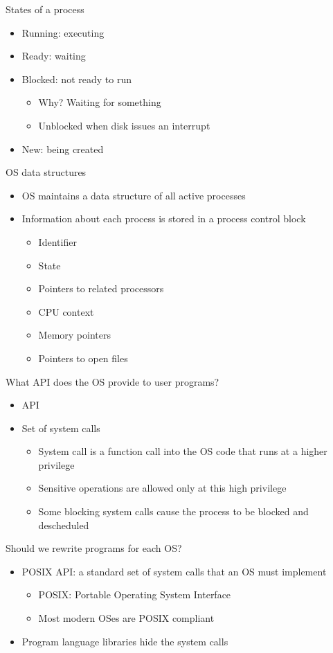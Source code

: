 \documentclass[12pt]{article}
\begin{document}
States of a process
\begin{itemize}
    \item Running: executing
    \item Ready: waiting
    \item Blocked: not ready to run
    \begin{itemize}
        \item Why? Waiting for something
        \item Unblocked when disk issues an interrupt
    \end{itemize}
    \item New: being created
\end{itemize}

OS data structures
\begin{itemize}
    \item OS maintains a data structure of all active processes
    \item Information about each process is stored in a process control block
    \begin{itemize}
        \item Identifier
        \item State
        \item Pointers to related processors
        \item CPU context
        \item Memory pointers
        \item Pointers to open files
    \end{itemize}
\end{itemize}

What API does the OS provide to user programs?
\begin{itemize}
    \item API
    \item Set of system calls
    \begin{itemize}
        \item System call is a function call into the OS code that runs at a higher privilege
        \item Sensitive operations are allowed only at this high privilege
        \item Some blocking system calls cause the process to be blocked and descheduled
    \end{itemize}
\end{itemize}

Should we rewrite programs for each OS?
\begin{itemize}
    \item POSIX API: a standard set of system calls that an OS must implement
    \begin{itemize}
        \item POSIX: Portable Operating System Interface
        \item Most modern OSes are POSIX compliant
    \end{itemize}
    \item Program language libraries hide the system calls
\end{itemize}
\end{document}
